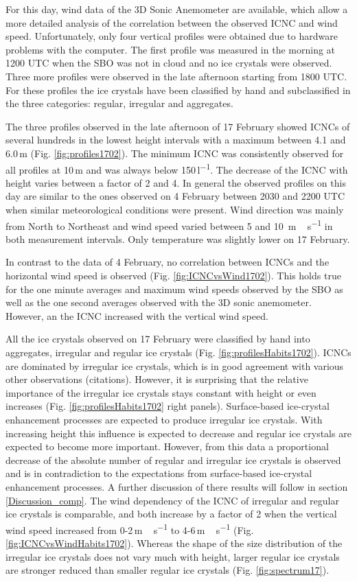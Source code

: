 \documentclass[draft,linenumbers]{agujournal}
\begin{document}
For this day, wind data of the 3D Sonic Anemometer are available, which allow a more detailed analysis of the correlation between the observed ICNC and wind speed. Unfortunately, only four vertical profiles were obtained  due to hardware problems with the computer. The first profile was measured in the morning at 1200 UTC when the SBO was not in cloud and no ice crystals were observed. Three more profiles were observed in the late afternoon starting from 1800 UTC. For these profiles the ice crystals have been classified by hand and subclassified in the three categories: regular, irregular and aggregates.

The three profiles observed in the late afternoon of 17 February showed ICNCs of several hundreds in the lowest height intervals with a maximum between 4.1 and 6.0\,\si{m} (Fig. \ref{fig:profiles1702}). The minimum ICNC was consistently observed for all profiles at 10\,\si{m} and was always below 150\,\si{l^{-1}}. The decrease of the ICNC with height varies between a factor of 2 and 4. In general the observed profiles on this day are similar to the ones observed on 4 February between 2030 and 2200 UTC when similar meteorological conditions were present. Wind direction was mainly from North to Northeast and wind speed varied between 5 and 10 \,\si{m\,s^{-1}} in both measurement intervals. Only temperature was slightly lower on 17 February.

In contrast to the data of 4 February, no correlation between ICNCs and the horizontal wind speed is observed (Fig. \ref{fig:ICNCvsWind1702}). This holds true for the one minute averages and maximum wind speeds observed by the SBO as well as the one second averages observed with the 3D sonic anemometer. However, an the ICNC increased with the vertical wind speed. 

All the ice crystals observed on 17 February were classified by hand into aggregates, irregular and regular ice crystals (Fig. \ref{fig:profilesHabits1702}). ICNCs are dominated by irregular ice crystals, which is in good agreement with various other observations (citations). However, it is surprising that the relative importance of the irregular ice crystals stays constant with height or even increases (Fig. \ref{fig:profilesHabits1702} right panels). Surface-based ice-crystal enhancement processes are expected to produce irregular ice crystals. With increasing height this influence is expected to decrease and regular ice crystals are expected to become more important. However, from this data a proportional decrease of the absolute number of regular and irregular ice crystals is observed and is in contradiction to the expectations from surface-based ice-crystal enhancement processes. A further discussion of there results will follow in section \ref{Discussion_comp}. The wind dependency of the ICNC of irregular and regular ice crystals is comparable, and both increase by a factor of 2 when the vertical wind speed increased from 0-2\,\si{m\,s^{-1}} to 4-6\,\si{m\,s^{-1}} (Fig. \ref{fig:ICNCvsWindHabits1702}). Whereas the shape of the size distribution of the irregular ice crystals does not vary much with height, larger regular ice crystals are stronger reduced than smaller regular ice crystals (Fig. \ref{fig:spectrum17}). 
\end{document}
